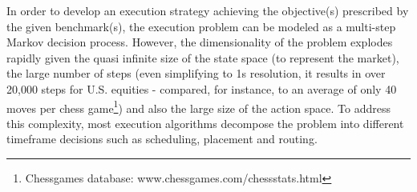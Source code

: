 In order to develop an execution strategy achieving the objective(s) prescribed by the given benchmark(s), the execution problem can be modeled as a multi-step Markov decision process. However, the dimensionality of the problem explodes rapidly given the quasi infinite size of the state space (to represent the market), the large number of steps (even simplifying to 1s resolution, it results in over 20,000 steps for U.S. equities - compared, for instance, to an average of only 40 moves per chess game\footnote{Chessgames database: www.chessgames.com/chessstats.html}) and also the large size of the action space. To address this complexity, most execution algorithms decompose the problem into different timeframe decisions such as scheduling, placement and routing. 

